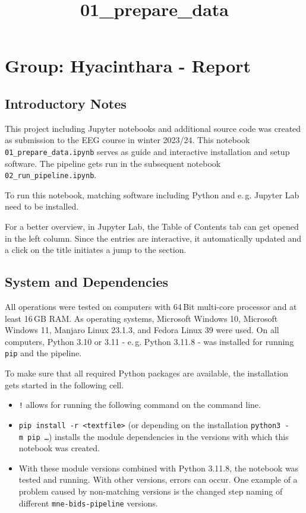 \documentclass[11pt]{article}
\title{01\_prepare\_data}
\providecommand{\tightlist}{%
      \setlength{\itemsep}{0pt}\setlength{\parskip}{0pt}}
\begin{document}
    
    \maketitle
    
    

    
    \section{Group: Hyacinthara - Report}\label{group-hyacinthara---report}

\subsection{Introductory Notes}\label{introductory-notes}

This project including Jupyter notebooks and additional source code was
created as submission to the EEG course in winter 2023/24. This notebook
\texttt{01\_prepare\_data.ipynb} serves as guide and interactive
installation and setup software. The pipeline gets run in the subsequent
notebook \texttt{02\_run\_pipeline.ipynb}.

To run this notebook, matching software including Python and e.\,g.
Jupyter Lab need to be installed.

For a better overview, in Jupyter Lab, the Table of Contents tab can get
opened in the left column. Since the entries are interactive, it
automatically updated and a click on the title initiates a jump to the
section.

\subsection{System and Dependencies}\label{system-and-dependencies}

All operations were tested on computers with 64\,Bit multi-core
processor and at least 16\,GB RAM. As operating systems, Microsoft
Windows 10, Microsoft Windows 11, Manjaro Linux 23.1.3, and Fedora Linux
39 were used. On all computers, Python 3.10 or 3.11 - e.\,g. Python
3.11.8 - was installed for running \texttt{pip} and the pipeline.

To make sure that all required Python packages are available, the
installation gets started in the following cell.

\begin{itemize}
\tightlist
\item
  \texttt{!} allows for running the following command on the command
  line.
\item
  \texttt{pip\ install\ -r\ \textless{}textfile\textgreater{}} (or
  depending on the installation \texttt{python3\ -m\ pip\ …}) installs
  the module dependencies in the versions with which this notebook was
  created.
\item
  With these module versions combined with Python 3.11.8, the notebook
  was tested and running. With other versions, errors can occur. One
  example of a problem caused by non-matching versions is the changed
  step naming of different \texttt{mne-bids-pipeline} versions.
\end{itemize}
\end{document}
